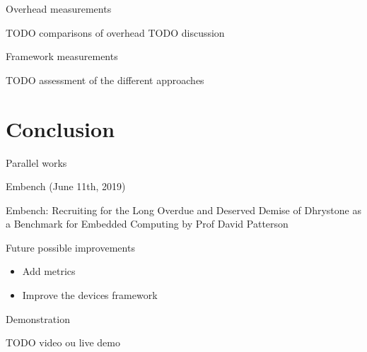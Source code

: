 \documentclass{beamer}
\begin{document}

\begin{frame}{Overhead measurements}
\protect\hypertarget{overhead-measurements}{}

TODO comparisons of overhead TODO discussion

\end{frame}


\begin{frame}{Framework measurements}
\protect\hypertarget{framework-measurements}{}

TODO assessment of the different approaches

\end{frame}


\hypertarget{conclusion}{%
\section{Conclusion}\label{conclusion}}

\begin{frame}{Parallel works}
\protect\hypertarget{parallel-works}{}

Embench (June 11th, 2019)

\end{frame}


\begin{frame}

Embench: Recruiting for the Long Overdue and Deserved Demise of
Dhrystone as a Benchmark for Embedded Computing by Prof David Patterson

\end{frame}


\begin{frame}{Future possible improvements}
\protect\hypertarget{future-possible-improvements}{}

\begin{itemize}
\tightlist
\item
  Add metrics
\item
  Improve the devices framework
\end{itemize}

\end{frame}


\begin{frame}{Demonstration}
\protect\hypertarget{demonstration}{}

TODO video ou live demo

\end{frame}
\end{document}
